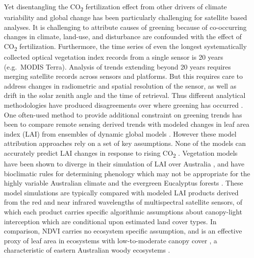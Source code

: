 \documentclass[gc, manuscript]{copernicus}
\begin{document}
Yet disentangling the CO\textsubscript{2} fertilization effect from
other drivers of climate variability and global change has been
particularly challenging for satellite based analyses. It is challenging
to attribute causes of greening because of co-occurring changes in
climate, land-use, and disturbance are confounded with the effect of
CO\textsubscript{2} fertilization. Furthermore, the time series of even
the longest systematically collected optical vegetation index records
from a single sensor is 20 years (e.g.~MODIS Terra). Analysis of trends
extending beyond 20 years requires merging satellite records across
sensors and platforms. But this requires care to address changes in
radiometric and spatial resolution of the sensor, as well as drift in
the solar zenith angle
\citep{jiEffectNOAASatellite2017a, frankenbergCOMMENTRECENTGLOBAL2021}
and the time of retrieval. Thus different analytical methodologies have
produced disagreements over where greening has occurred
\citep{cortesWhereAreGlobal2021}. One often-used method to provide
additional constraint on greening trends has been to compare remote
sensing derived trends with modeled changes in leaf area index (LAI)
from ensembles of dynamic global models
\citep{zhuGreeningEarthIts2016a, wangRecentGlobalDecline2020}. However
these model attribution approaches rely on a set of key assumptions.
None of the models can accurately predict LAI changes in response to
rising CO\textsubscript{2}
\citep{dekauwe_etal14, medlynUsingModelsGuide2016c}. Vegetation models
have been shown to diverge in their simulation of LAI over Australia
\citep{medlynUsingModelsGuide2016c, teckentrupAssessingRepresentationAustralian2021, zhuGreeningEarthIts2016a},
and have bioclimatic rules for determining phenology which may not be
appropriate for the highly variable Australian climate and the evergreen
Eucalyptus forests
\citep{teckentrupAssessingRepresentationAustralian2021}. These model
simulations are typically compared with modeled LAI products derived
from the red and near infrared wavelengths of multispectral satellite
sensors, of which each product carries specific algorithmic assumptions
about canopy-light interception which are conditional upon estimated
land cover types. In comparison, NDVI carries no ecosystem specific
assumption, and is an effective proxy of leaf area in ecosystems with
low-to-moderate canopy cover \citep{carlsonRelationNDVIFractional1997a},
a characteristic of eastern Australian woody ecosystems
\citep{spechtWaterUsePerennial1972, yangApplyingConceptEcohydrological2018a}.
\end{document}
